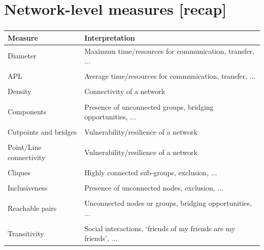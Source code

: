 \documentclass[8pt]{beamer}
\begin{document}
\section{Network-level measures [recap]}

\bgroup
{}
\begin{frame}[plain]{}
\begin{center}
\color{white}{\Huge\insertsection}
\end{center}
\end{frame}
\egroup


\begin{frame}
\frametitle{\insertsection}

\footnotesize
\centering
\begin{tabular}{lp{7.5cm}}
\toprule
\textbf{Measure} & \textbf{Interpretation}\\
\hline
Diameter                        & Maximum time/resources for communication, transfer, ...\\
\\
APL                             & Average time/resources for communication, transfer, ...\\
\\
Density                         & Connectivity of a network \\
\\
Components                      & Presence of unconnected groups, bridging opportunities, ... \\
\\
Cutpoints and bridges           & Vulnerability/resilience of a network\\
\\
Point/Line connectivity         & Vulnerability/resilience of a network\\
\\
Cliques                         & Highly connected sub-groups, exclusion, ...\\
\\
Inclusiveness                   & Presence of unconnected nodes, exclusion, ... \\    
\\
Reachable pairs                 & Unconnected nodes or groups, bridging opportunities, ... \\
\\
Transitivity                    & Social interactions, `friends of my friends are my friends', ... \\

\bottomrule
\end{tabular}

\end{frame}
\end{document}

